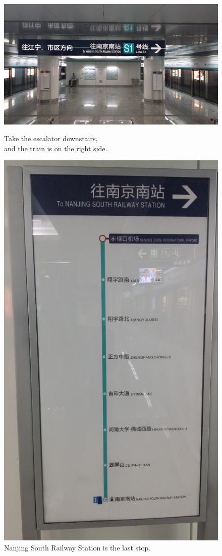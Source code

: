 \documentclass[11pt]{article}
\begin{document}
 \begin{figure}[!h]
	\begin{minipage}[t]{.5\textwidth}
     	\centering
        	\includegraphics[scale=0.27]{20150331_110903.jpg}
    		\caption{Take the escalator downstairs, \protect \\ and the train is on the right side. \label{20150331_110903}}
	\end{minipage}%
     \begin{minipage}[t]{.5\textwidth}
         \centering
       	 \includegraphics[scale=0.27]{20150331_110935.jpg}
		\caption{Nanjing South Railway Station is the last stop.}
    \end{minipage}%
 \end{figure}
\end{document}
